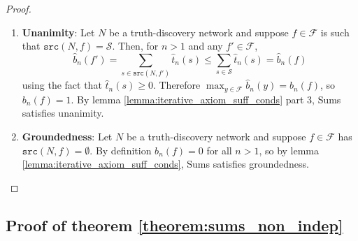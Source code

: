 \documentclass{article}
\theoremstyle{definition} \newtheorem{definition}{Definition}
\theoremstyle{definition} \newtheorem{example}{Example}
\theoremstyle{plain} \newtheorem{axiom}{Axiom}
\theoremstyle{plain} \newtheorem*{remark}{Remark}
\theoremstyle{remark} \newtheorem*{notation}{Notation}
\theoremstyle{plain} \newtheorem{lemma}{Lemma}
\theoremstyle{plain} \newtheorem{theorem}{Theorem}
\theoremstyle{plain} \newtheorem{proposition}{Proposition}
\renewcommand{\S}{\mathcal{S}}  %
\newcommand{\F}{\mathcal{F}}
\newcommand{\src}{\texttt{src}}
\begin{document}
\begin{proof}
\begin{enumerate}
\item\textbf{Unanimity}: Let $N$ be a truth-discovery network and suppose $f \in \F$
is such that $\src(N, f) = \S$. Then, for $n > 1$ and any $f' \in \F$,
\[
    \hat{b}_n(f') = \sum_{s \in \src(N, f')}{\hat{t}_n(s)}
                  \le \sum_{s \in \S}{\hat{t}_n(s)}
                  = \hat{b}_n(f)
\]
using the fact that $\hat{t}_n(s) \ge 0$. Therefore $\max_{y \in
\F}{\hat{b}_n(y)} = \hat{b}_n(f)$, so $b_n(f) = 1$. By lemma
\ref{lemma:iterative_axiom_suff_conds} part 3, Sums satisfies unanimity.

\item\textbf{Groundedness}: Let $N$ be a truth-discovery network and suppose $f
\in \F$ has $\src(N, f) = \emptyset$. By definition $b_n(f) = 0$ for all $n >
1$, so by lemma \ref{lemma:iterative_axiom_suff_conds}, Sums satisfies
groundedness.

\end{enumerate}

\end{proof}

\subsection{Proof of theorem \ref{theorem:sums_non_indep}}
\end{document}
